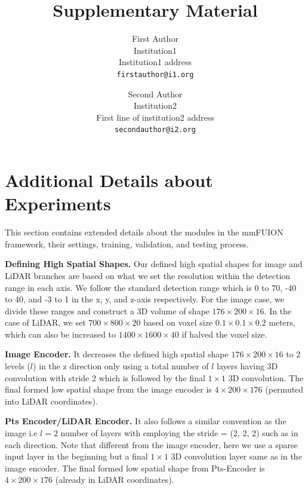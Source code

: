 \documentclass[10pt,twocolumn,letterpaper]{article}
\begin{document}
\title{Supplementary Material}

\author{First Author\\
Institution1\\
Institution1 address\\
{\tt\small firstauthor@i1.org}
\and
Second Author\\
Institution2\\
First line of institution2 address\\
{\tt\small secondauthor@i2.org}
}
\maketitle

\section{Additional Details about Experiments}
This section contains extended details about the modules in the mmFUION framework, their settings, training, validation, and testing process. 

\textbf{Defining High Spatial Shapes.}
Our defined high spatial shapes for image and LiDAR branches are based on what we set the resolution within the detection range in each axis. We follow the standard detection range which is 0 to 70, -40 to 40, and -3 to 1 in the x, y, and z-axis respectively. For the image case, we divide these ranges and construct a 3D volume of shape $176\times200\times16$. In the case of LiDAR, we set $700\times800\times20$ based on voxel size $0.1\times0.1\times0.2$ meters, which can also be increased to $1400\times1600\times40$ if halved the voxel size. 

\textbf{Image Encoder.}
It decreases the defined high spatial shape $176\times200\times16$ to 2 levels ($l$) in the z direction only using a total number of $l$ layers having 3D convolution with stride 2 which is followed by the final $1\times1$ 3D convolution. The final formed low spatial shape from the image encoder is $4\times200\times176$ (permuted into LiDAR coordinates).

\textbf{Pts Encoder/LiDAR Encoder.} 
It also follows a similar convention as the image i.e $l=2$ number of layers with employing the stride = (2, 2, 2) such as in each direction. Note that different from the image encoder, here we use a sparse input layer in the beginning but a final $1\times1$ 3D convolution layer same as in the image encoder. The final formed low spatial shape from Pts-Encoder is $4\times200\times176$ (already in LiDAR coordinates). 
\end{document}

